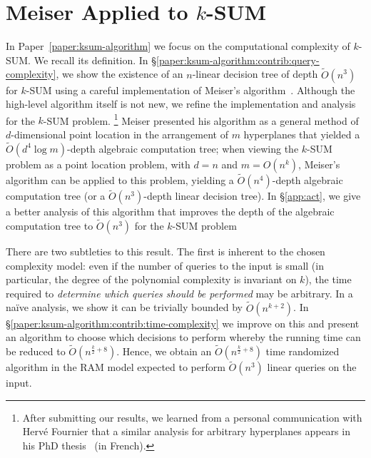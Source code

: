 \section{Meiser Applied to \texorpdfstring{\(k\)-SUM}{k-SUM}}%
\label{sec:contribution:ksum-algorithm}

In Paper~\ref{paper:ksum-algorithm}
we focus on the computational complexity of \(k\)-SUM\@. We recall its
definition.
%
\ProblemKSUM*
%
In \S\ref{paper:ksum-algorithm:contrib:query-complexity}, we show the existence of an $n$-linear
decision tree of depth $\tilde{O}(n^3)$ for \(k\)-SUM using a careful
implementation of Meiser's algorithm~\cite{Mei93}.
%
Although the high-level algorithm itself is not new, we refine the
implementation and analysis for the \(k\)-SUM problem.%
\footnote{After submitting our results, we learned from a personal communication
with Herv\'e Fournier that a similar analysis for arbitrary hyperplanes appears in his PhD
thesis~\cite{F01} (in French).}
%
Meiser presented his algorithm as a general method of
$d$-dimensional
point location in the
arrangement of $m$ hyperplanes that yielded a
$\tilde{O}(d^4 \log m)$-depth algebraic computation tree;
%
when viewing the \(k\)-SUM problem as a point
location problem, with \(d=n\) and \(m = O(n^k)\),
Meiser's algorithm can be applied
to this problem, yielding
a \(\tilde{O}(n^4)\)-depth algebraic computation tree
(or a \(\tilde{O}(n^3)\)-depth linear decision tree).
%
In \S\ref{app:act},
we give a better analysis of this algorithm that
improves the depth of the algebraic computation tree to
\( \tilde{O}(n^3) \) for the \(k\)-SUM problem

There are two subtleties to this result. The first is inherent to the chosen
complexity model: even if the number of queries to the input is small (in
particular, the degree of the polynomial complexity is invariant on $k$), the
time required to \emph{determine which queries should be performed} may be
arbitrary. In a na\"ive analysis, we show it can be trivially bounded by
$\tilde{O}(n^{k+2})$.
%
%
In \S\ref{paper:ksum-algorithm:contrib:time-complexity} we improve on this and present an
algorithm to choose which decisions to perform whereby the running time can be
reduced to $\tilde{O}(n^{\frac{k}{2}+8})$. Hence, we obtain an
$\tilde{O}(n^{\frac{k}{2}+8})$ time randomized algorithm in the RAM model
expected to perform $\tilde{O}(n^3)$ linear queries on the input.
%


